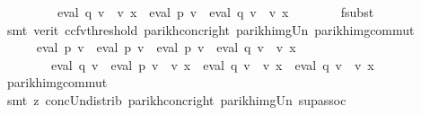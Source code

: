 \begin{isabellebody}
\ \ \ \ \ \ \ \ {\isasymunion}\ eval\ q{}\ v\ {\isacharat}{\kern0pt}{\isacharat}{\kern0pt}\ v\ x\ {\isacharat}{\kern0pt}{\isacharat}{\kern0pt}\ {\isacharparenleft}{\kern0pt}eval\ p{}\ v\ {\isasymunion}\ eval\ q{}\ v\ {\isacharat}{\kern0pt}{\isacharat}{\kern0pt}\ v\ x{\isacharparenright}{\kern0pt}{\isacharparenright}{\kern0pt}{\isachardoublequoteclose}\isanewline
\ \ \ \ \ \ \isamarkupfalse%
\ f{}{\isacharunderscore}{\kern0pt}subst\ \isamarkupfalse%
\ {\isacharparenleft}{\kern0pt}smt\ {\isacharparenleft}{\kern0pt}verit{\isacharcomma}{\kern0pt}\ ccfv{\isacharunderscore}{\kern0pt}threshold{\isacharparenright}{\kern0pt}\ parikh{\isacharunderscore}{\kern0pt}conc{\isacharunderscore}{\kern0pt}right\ parikh{\isacharunderscore}{\kern0pt}img{\isacharunderscore}{\kern0pt}Un\ parikh{\isacharunderscore}{\kern0pt}img{\isacharunderscore}{\kern0pt}commut{\isacharparenright}{\kern0pt}\isanewline
\ \ \ \ \isamarkupfalse%
\ \isamarkupfalse%
\ {\isachardoublequoteopen}{\isasymdots}\ {\isacharequal}{\kern0pt}\ {\isasymPsi}\ {\isacharparenleft}{\kern0pt}eval\ p{}\ v\ {\isacharat}{\kern0pt}{\isacharat}{\kern0pt}\ eval\ p{}\ v\ {\isasymunion}\ {\isacharparenleft}{\kern0pt}eval\ p{}\ v\ {\isacharat}{\kern0pt}{\isacharat}{\kern0pt}\ eval\ q{}\ v\ {\isacharat}{\kern0pt}{\isacharat}{\kern0pt}\ v\ x\ {\isasymunion}\isanewline
\ \ \ \ \ \ \ \ eval\ q{}\ v\ {\isacharat}{\kern0pt}{\isacharat}{\kern0pt}\ eval\ p{}\ v\ {\isacharat}{\kern0pt}{\isacharat}{\kern0pt}\ v\ x\ {\isasymunion}\ eval\ q{}\ v\ {\isacharat}{\kern0pt}{\isacharat}{\kern0pt}\ v\ x\ {\isacharat}{\kern0pt}{\isacharat}{\kern0pt}\ eval\ q{}\ v\ {\isacharat}{\kern0pt}{\isacharat}{\kern0pt}\ v\ x{\isacharparenright}{\kern0pt}{\isacharparenright}{\kern0pt}{\isachardoublequoteclose}\isanewline
\ \ \ \ \ \ \isamarkupfalse%
\ parikh{\isacharunderscore}{\kern0pt}img{\isacharunderscore}{\kern0pt}commut\ \isamarkupfalse%
\ {\isacharparenleft}{\kern0pt}smt\ {\isacharparenleft}{\kern0pt}z{}{\isacharparenright}{\kern0pt}\ conc{\isacharunderscore}{\kern0pt}Un{\isacharunderscore}{\kern0pt}distrib{\isacharparenleft}{\kern0pt}{}{\isacharparenright}{\kern0pt}\ parikh{\isacharunderscore}{\kern0pt}conc{\isacharunderscore}{\kern0pt}right\ parikh{\isacharunderscore}{\kern0pt}img{\isacharunderscore}{\kern0pt}Un\ sup{\isacharunderscore}{\kern0pt}assoc{\isacharparenright}{\kern0pt}\isanewline

\end{isabellebody}
